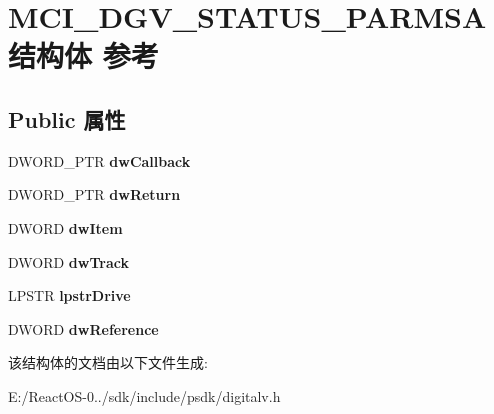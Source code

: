 \hypertarget{struct_m_c_i___d_g_v___s_t_a_t_u_s___p_a_r_m_s_a}{}\section{M\+C\+I\+\_\+\+D\+G\+V\+\_\+\+S\+T\+A\+T\+U\+S\+\_\+\+P\+A\+R\+M\+S\+A结构体 参考}
\label{struct_m_c_i___d_g_v___s_t_a_t_u_s___p_a_r_m_s_a}
\subsection*{Public 属性}
\begin{DoxyCompactItemize}
\item 
\mbox{\label{struct_m_c_i___d_g_v___s_t_a_t_u_s___p_a_r_m_s_a_a027ac8a3daeea8bf0349247a9450400d}} 
D\+W\+O\+R\+D\+\_\+\+P\+TR {\bfseries dw\+Callback}
\item 
\mbox{\label{struct_m_c_i___d_g_v___s_t_a_t_u_s___p_a_r_m_s_a_a599254cf035ab178755753aef30d1c2f}} 
D\+W\+O\+R\+D\+\_\+\+P\+TR {\bfseries dw\+Return}
\item 
\mbox{\label{struct_m_c_i___d_g_v___s_t_a_t_u_s___p_a_r_m_s_a_a69ccc0e4d38bce3db444c6952956f84b}} 
D\+W\+O\+RD {\bfseries dw\+Item}
\item 
\mbox{\label{struct_m_c_i___d_g_v___s_t_a_t_u_s___p_a_r_m_s_a_a424801be272d180e0e020e6d7a6d947b}} 
D\+W\+O\+RD {\bfseries dw\+Track}
\item 
\mbox{\label{struct_m_c_i___d_g_v___s_t_a_t_u_s___p_a_r_m_s_a_a33d522d10f32e13e0604549b947fd2fc}} 
L\+P\+S\+TR {\bfseries lpstr\+Drive}
\item 
\mbox{\label{struct_m_c_i___d_g_v___s_t_a_t_u_s___p_a_r_m_s_a_a7b8f096a24fd72b82196d9b3579c91ab}} 
D\+W\+O\+RD {\bfseries dw\+Reference}
\end{DoxyCompactItemize}


该结构体的文档由以下文件生成\+:\begin{DoxyCompactItemize}
\item 
E\+:/\+React\+O\+S-\/0../sdk/include/psdk/digitalv.\+h\end{DoxyCompactItemize}
